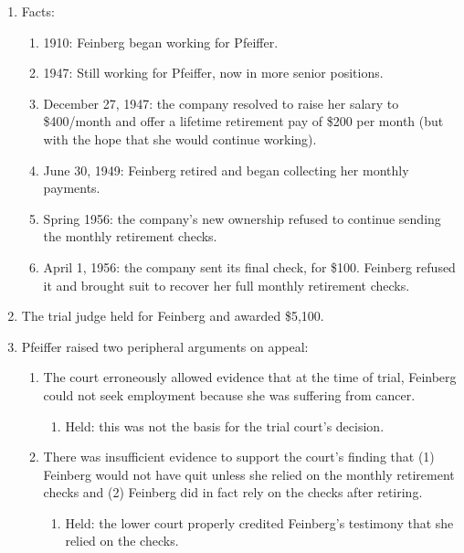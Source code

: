 \begin{enumerate}
    \item Facts:
    \begin{enumerate}
        \item 1910: Feinberg began working for Pfeiffer.
        \item 1947: Still working for Pfeiffer, now in more senior positions.
        \item December 27, 1947: the company resolved to raise her salary to 
        \$400/month and offer a lifetime retirement pay of \$200 per month 
        (but with the hope that she would continue working).
        \item June 30, 1949: Feinberg retired and began collecting her monthly 
        payments.
        \item Spring 1956: the company's new ownership refused to continue 
        sending the monthly retirement checks.
        \item April 1, 1956: the company sent its final check, for \$100. 
        Feinberg refused it and brought suit to recover her full monthly 
        retirement checks.
    \end{enumerate}
    \item The trial judge held for Feinberg and awarded \$5,100.
    \item Pfeiffer raised two peripheral arguments on appeal:
    \begin{enumerate}
        \item The court erroneously allowed evidence that at the time of 
        trial, Feinberg could not seek employment because she was suffering 
        from cancer.
        \begin{enumerate}
            \item Held: this was not the basis for the trial court's decision.
        \end{enumerate}
        \item There was insufficient evidence to support the court's finding 
        that (1) Feinberg would not have quit unless she relied on the monthly 
        retirement checks and (2) Feinberg did in fact rely on the checks 
        after retiring.
        \begin{enumerate}
            \item Held: the lower court properly credited Feinberg's testimony 
            that she relied on the checks.
        \end{enumerate}
    \end{enumerate}

\end{enumerate}
